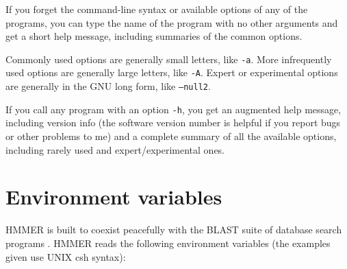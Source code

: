 \documentclass[11pt]{report}
\newcommand{\prog}[1]{\texttt{#1}}
\begin{document}
If you forget the command-line syntax or available options of any of
the programs, you can type the name of the program with no other
arguments and get a short help message, including summaries of the
common options.

Commonly used options are generally small letters, like \prog{-a}.
More infrequently used options are generally large letters, like
\prog{-A}. Expert or experimental options are generally in the GNU long form,
like \prog{--null2}.

If you call any program with an option {\tt -h}, you get an augmented
help message, including version info (the software version number is
helpful if you report bugs or other problems to me) and a complete
summary of all the available options, including rarely used and
expert/experimental ones.

\section {Environment variables}

HMMER is built to coexist peacefully with the BLAST suite of database
search programs \cite{Altschul91}. HMMER reads the following
environment variables (the examples given use UNIX csh syntax):
\end{document}
